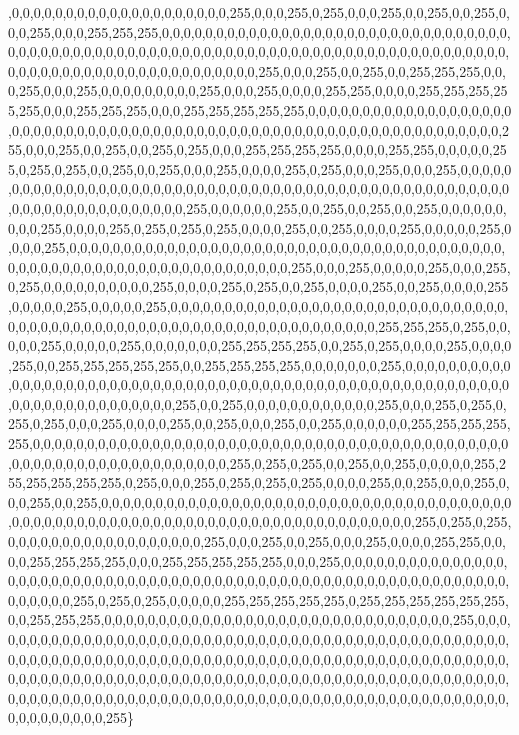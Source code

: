 \begin{DoxyCompactItemize}
,0,0,0,0,0,0,0,0,0,0,0,0,0,0,0,0,0,0,0,0,255,0,0,0,255,0,255,0,0,0,255,0,0,255,0,0,255,0,0,0,255,0,0,0,255,255,255,0,0,0,0,0,0,0,0,0,0,0,0,0,0,0,0,0,0,0,0,0,0,0,0,0,0,0,0,0,0,0,0,0,0,0,0,0,0,0,0,0,0,0,0,0,0,0,0,0,0,0,0,0,0,0,0,0,0,0,0,0,0,0,0,0,0,0,0,0,0,0,0,0,0,0,0,0,0,0,0,0,0,0,0,0,0,0,0,0,0,0,0,0,0,0,0,0,0,0,0,0,255,0,0,0,255,0,0,255,0,0,255,255,255,0,0,0,255,0,0,0,255,0,0,0,0,0,0,0,0,0,255,0,0,0,255,0,0,0,0,255,255,0,0,0,0,255,255,255,255,255,0,0,0,255,255,255,0,0,0,255,255,255,255,255,0,0,0,0,0,0,0,0,0,0,0,0,0,0,0,0,0,0,0,0,0,0,0,0,0,0,0,0,0,0,0,0,0,0,0,0,0,0,0,0,0,0,0,0,0,0,0,0,0,0,0,0,0,0,0,0,0,0,0,0,0,0,0,0,255,0,0,0,255,0,0,255,0,0,255,0,255,0,0,0,255,255,255,255,0,0,0,0,255,255,0,0,0,0,0,255,0,255,0,255,0,0,255,0,0,255,0,0,0,255,0,0,0,0,255,0,255,0,0,0,255,0,0,0,255,0,0,0,0,0,0,0,0,0,0,0,0,0,0,0,0,0,0,0,0,0,0,0,0,0,0,0,0,0,0,0,0,0,0,0,0,0,0,0,0,0,0,0,0,0,0,0,0,0,0,0,0,0,0,0,0,0,0,0,0,0,0,0,0,0,0,0,255,0,0,0,0,0,0,255,0,0,255,0,0,255,0,0,255,0,0,0,0,0,0,0,0,0,255,0,0,0,0,255,0,255,0,255,0,255,0,0,0,0,255,0,0,255,0,0,0,0,255,0,0,0,0,0,255,0,0,0,0,255,0,0,0,0,0,0,0,0,0,0,0,0,0,0,0,0,0,0,0,0,0,0,0,0,0,0,0,0,0,0,0,0,0,0,0,0,0,0,0,0,0,0,0,0,0,0,0,0,0,0,0,0,0,0,0,0,0,0,0,0,0,0,0,0,0,0,255,0,0,0,255,0,0,0,0,0,255,0,0,0,255,0,255,0,0,0,0,0,0,0,0,0,0,255,0,0,0,0,255,0,255,0,0,255,0,0,0,0,255,0,0,255,0,0,0,0,255,0,0,0,0,0,255,0,0,0,0,0,255,0,0,0,0,0,0,0,0,0,0,0,0,0,0,0,0,0,0,0,0,0,0,0,0,0,0,0,0,0,0,0,0,0,0,0,0,0,0,0,0,0,0,0,0,0,0,0,0,0,0,0,0,0,0,0,0,0,0,0,0,0,0,0,0,0,255,255,255,0,255,0,0,0,0,0,255,0,0,0,0,0,255,0,0,0,0,0,0,0,255,255,255,255,0,0,255,0,255,0,0,0,0,255,0,0,0,0,255,0,0,255,255,255,255,255,0,0,255,255,255,255,0,0,0,0,0,0,0,255,0,0,0,0,0,0,0,0,0,0,0,0,0,0,0,0,0,0,0,0,0,0,0,0,0,0,0,0,0,0,0,0,0,0,0,0,0,0,0,0,0,0,0,0,0,0,0,0,0,0,0,0,0,0,0,0,0,0,0,0,0,0,0,0,0,0,0,0,0,0,0,255,0,0,255,0,0,0,0,0,0,0,0,0,0,0,0,255,0,0,0,255,0,255,0,255,0,255,0,0,0,255,0,0,0,0,255,0,0,255,0,0,0,255,0,0,255,0,0,0,0,0,0,255,255,255,255,255,0,0,0,0,0,0,0,0,0,0,0,0,0,0,0,0,0,0,0,0,0,0,0,0,0,0,0,0,0,0,0,0,0,0,0,0,0,0,0,0,0,0,0,0,0,0,0,0,0,0,0,0,0,0,0,0,0,0,0,0,0,0,0,0,255,0,255,0,255,0,0,255,0,0,255,0,0,0,0,0,255,255,255,255,255,255,0,255,0,0,0,255,0,255,0,255,0,255,0,0,0,0,255,0,0,255,0,0,0,255,0,0,0,255,0,0,255,0,0,0,0,0,0,0,0,0,0,0,0,0,0,0,0,0,0,0,0,0,0,0,0,0,0,0,0,0,0,0,0,0,0,0,0,0,0,0,0,0,0,0,0,0,0,0,0,0,0,0,0,0,0,0,0,0,0,0,0,0,0,0,0,0,0,0,0,0,0,0,0,0,0,0,255,0,255,0,255,0,0,0,0,0,0,0,0,0,0,0,0,0,0,0,0,0,0,255,0,0,0,255,0,0,255,0,0,0,255,0,0,0,0,255,255,0,0,0,0,255,255,255,255,0,0,0,255,255,255,255,255,0,0,0,255,0,0,0,0,0,0,0,0,0,0,0,0,0,0,0,0,0,0,0,0,0,0,0,0,0,0,0,0,0,0,0,0,0,0,0,0,0,0,0,0,0,0,0,0,0,0,0,0,0,0,0,0,0,0,0,0,0,0,0,0,0,0,0,0,0,0,0,255,0,255,0,255,0,0,0,0,0,255,255,255,255,255,0,255,255,255,255,255,255,0,0,255,255,255,0,0,0,0,0,0,0,0,0,0,0,0,0,0,0,0,0,0,0,0,0,0,0,0,0,0,0,0,0,0,0,0,255,0,0,0,0,0,0,0,0,0,0,0,0,0,0,0,0,0,0,0,0,0,0,0,0,0,0,0,0,0,0,0,0,0,0,0,0,0,0,0,0,0,0,0,0,0,0,0,0,0,0,0,0,0,0,0,0,0,0,0,0,0,0,0,0,0,0,0,0,0,0,0,0,0,0,0,0,0,0,0,0,0,0,0,0,0,0,0,0,0,0,0,0,0,0,0,0,0,0,0,0,0,0,0,0,0,0,0,0,0,0,0,0,0,0,0,0,0,0,0,0,0,0,0,0,0,0,0,0,0,0,0,0,0,0,0,0,0,0,0,0,0,0,0,0,0,0,0,0,0,0,0,0,0,0,0,0,0,0,0,0,0,0,0,0,0,0,0,0,0,0,0,0,0,0,0,0,0,0,0,0,0,0,0,0,0,0,0,0,0,0,0,0,0,0,0,0,255\}
\end{DoxyCompactItemize}


